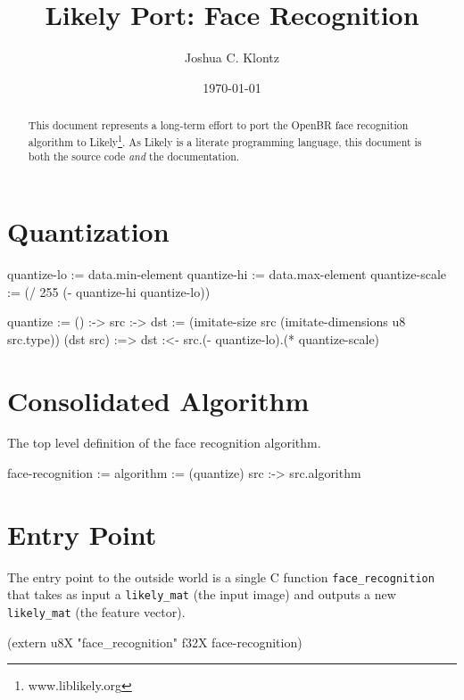 \documentclass{article}
\title{Likely Port: Face Recognition}
\author{Joshua C. Klontz}
\date{\today}
\newenvironment{likely}
{ \verbatim }
{ \endverbatim }
\begin{document}
\maketitle

\begin{abstract}
This document represents a long-term effort to port the OpenBR face recognition algorithm to Likely\footnote{www.liblikely.org}.
As Likely is a literate programming language, this document is both the source code \emph{and} the documentation.
\end{abstract}

\section{Quantization}
\begin{likely}
quantize-lo := data.min-element
quantize-hi := data.max-element
quantize-scale := (/ 255 (- quantize-hi quantize-lo))

quantize :=
  () :->
    src :->
    {
      dst := (imitate-size src (imitate-dimensions u8 src.type))
      (dst src) :=>
        dst :<- src.(- quantize-lo).(* quantize-scale)
    }
\end{likely}

\section{Consolidated Algorithm}
The top level definition of the face recognition algorithm.

\begin{likely}
face-recognition :=
{
  algorithm := (quantize)
  src :->
    src.algorithm
}
\end{likely}

\section{Entry Point}
The entry point to the outside world is a single C function \texttt{face\_recognition} that takes as input a \texttt{likely\_mat} (the input image) and outputs a new \texttt{likely\_mat} (the feature vector).

\begin{likely}
(extern u8X "face_recognition" f32X face-recognition)
\end{likely}
\end{document}
